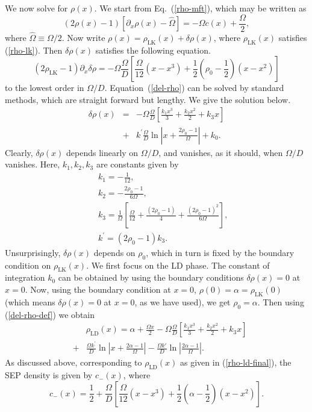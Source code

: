 \documentclass[aps,pre,twocolumn,superscriptaddress,amsmath,amssymb,longbibliography,floatfix]{revtex4}
\begin{document}
{We now solve for $\rho(x)$. We start from Eq.~(\ref{rho-mft}), which may be written as 
\begin{equation}
 (2\rho(x)-1)[{\partial}_x\rho(x)-\hat\Omega]=-\Omega c(x) +\frac{\Omega}{2},
\end{equation}
where $\hat\Omega \equiv \Omega/2$. Now write $\rho(x)=\rho_\text{LK}(x)+\delta\rho(x)$, where $\rho_\text{LK}(x)$ satisfies (\ref{rho-lk}). Then $\delta\rho(x)$ satisfies the following equation.
\begin{equation}
(2\rho_\text{LK}-1){\partial}_x\delta\rho=-\Omega\frac{\Omega}{D} \left[\frac{\Omega}{12}(x-x^3)+\frac{1}{2}(\rho_0-\frac{1}{2})(x-x^2)\right] \label{del-rho}
\end{equation}
to the lowest order in $\Omega/D$. Equation~(\ref{del-rho}) can be solved by standard methods, which are straight forward but lengthy. We give the solution below.
\begin{eqnarray}
 \delta\rho(x)&=&-\Omega\frac{\Omega}{D}\left[\frac{k_1x^3}{3}+\frac{k_2x^2}{2}+k_3x\right]\nonumber \\&+&k^\prime\frac{\Omega}{D}\ln |x+\frac{2\rho_0-1}{\Omega}| + k_0.\label{delta-rho-basic}
\end{eqnarray}
Clearly, $\delta\rho(x)$ depends linearly on $\Omega/D$, and vanishes, as it should, when $\Omega/D$ vanishes. Here, $k_1,k_2,k_3$ are constants given by
\begin{eqnarray}
 &&k_1=-\frac{1}{12},\\
 &&k_2=-\frac{2\rho_0-1}{6\Omega},\\
 &&k_3=\frac{1}{\Omega} \left[\frac{\Omega}{12}+\frac{(2\rho_0-1)}{4}+\frac{(2\rho_0-1)^2}{6\Omega}\right],\\
 &&k^\prime=(2\rho_0-1)k_3.
\end{eqnarray}
Unsurprisingly, $\delta \rho(x)$ depends on $\rho_0$, which in turn is fixed by the boundary condition on $\rho_\text{LK}(x)$. We first focus on the LD phase. The constant of integration $k_0$ can be obtained by using the boundary conditions  $\delta\rho(x)=0$ at $x=0$. Now,
using the boundary condition at $x=0$, $\rho(0)=\alpha=\rho_\text{LK}(0)$ (which means $\delta\rho(x)=0$ at $x=0$, as we have used), we get $\rho_0=\alpha$. Then using (\ref{del-rho-def}) we obtain
\begin{eqnarray}
 &&\rho_\text{LD}(x)=\alpha +\frac{\Omega x}{2}-\Omega\frac{\Omega}{D}[\frac{k_1x^3}{3}+\frac{k_2x^2}{2}+k_3x]\nonumber \\&+&\frac{\Omega k^\prime}{D}\ln|x+\frac{2\alpha-1}{\Omega}|-\frac{\Omega k'}{D}\ln |\frac{2\alpha-1}{\Omega}|.\label{rho-ld-final}
 \end{eqnarray}
 As discussed above, corresponding to $\rho_\text{LD}(x)$ as given in (\ref{rho-ld-final}), the SEP density is given by $c_-(x)$, where
\begin{equation}
 c_-(x)= \frac{1}{2} + \frac{\Omega}{D}\left[\frac{\Omega}{12}(x-x^3)+\frac{1}{2}(\alpha-\frac{1}{2})(x-x^2)\right].\label{c-minus}
\end{equation}

}
\end{document}
